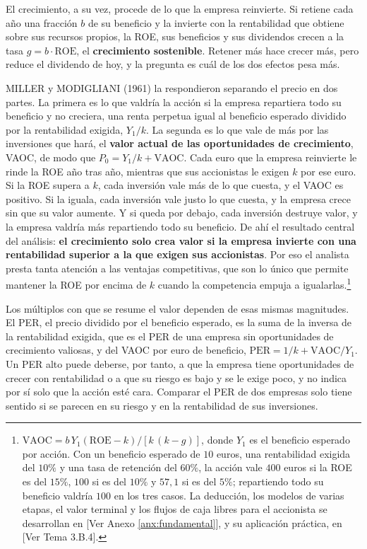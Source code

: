 \documentclass[10pt,a4paper]{article}
\newcommand{\authorfont}[1]{{\fontfamily{EBGaramond-TLF}\selectfont #1}}
\begin{document}
El crecimiento, a su vez, procede de lo que la empresa reinvierte. Si retiene cada año una fracción $b$ de su beneficio y la invierte con la rentabilidad que obtiene sobre sus recursos propios, la ROE, sus beneficios y sus dividendos crecen a la tasa $g=b\cdot\text{ROE}$, el \textbf{crecimiento sostenible}. Retener más hace crecer más, pero reduce el dividendo de hoy, y la pregunta es cuál de los dos efectos pesa más.

MILLER y MODIGLIANI (1961) la respondieron separando el precio en dos partes. La primera es lo que valdría la acción si la empresa repartiera todo su beneficio y no creciera, una renta perpetua igual al beneficio esperado dividido por la rentabilidad exigida, $Y_1/k$. La segunda es lo que vale de más por las inversiones que hará, el \textbf{valor actual de las oportunidades de crecimiento}, VAOC, de modo que $P_0=Y_1/k+\text{VAOC}$. Cada euro que la empresa reinvierte le rinde la ROE año tras año, mientras que sus accionistas le exigen $k$ por ese euro. Si la ROE supera a $k$, cada inversión vale más de lo que cuesta, y el VAOC es positivo. Si la iguala, cada inversión vale justo lo que cuesta, y la empresa crece sin que su valor aumente. Y si queda por debajo, cada inversión destruye valor, y la empresa valdría más repartiendo todo su beneficio. De ahí el resultado central del análisis: \textbf{el crecimiento solo crea valor si la empresa invierte con una rentabilidad superior a la que exigen sus accionistas}. Por eso el analista presta tanta atención a las ventajas competitivas, que son lo único que permite mantener la ROE por encima de $k$ cuando la competencia empuja a igualarlas.\footnote{%
    $\text{VAOC}=b\,Y_1(\text{ROE}-k)/[k\,(k-g)]$, donde $Y_1$ es el beneficio esperado por acción. Con un beneficio esperado de $10$ euros, una rentabilidad exigida del $10\%$ y una tasa de retención del $60\%$, la acción vale $400$ euros si la ROE es del $15\%$, $100$ si es del $10\%$ y $57{,}1$ si es del $5\%$; repartiendo todo su beneficio valdría $100$ en los tres casos. La deducción, los modelos de varias etapas, el valor terminal y los flujos de caja libres para el accionista se desarrollan en [\authorfont{Ver Anexo \ref{anx:fundamental}}], y su aplicación práctica, en [\authorfont{Ver Tema 3.B.4}].
}

Los múltiplos con que se resume el valor dependen de esas mismas magnitudes. El PER, el precio dividido por el beneficio esperado, es la suma de la inversa de la rentabilidad exigida, que es el PER de una empresa sin oportunidades de crecimiento valiosas, y del VAOC por euro de beneficio, $\text{PER}=1/k+\text{VAOC}/Y_1$. Un PER alto puede deberse, por tanto, a que la empresa tiene oportunidades de crecer con rentabilidad o a que su riesgo es bajo y se le exige poco, y no indica por sí solo que la acción esté cara. Comparar el PER de dos empresas solo tiene sentido si se parecen en su riesgo y en la rentabilidad de sus inversiones.
\end{document}
